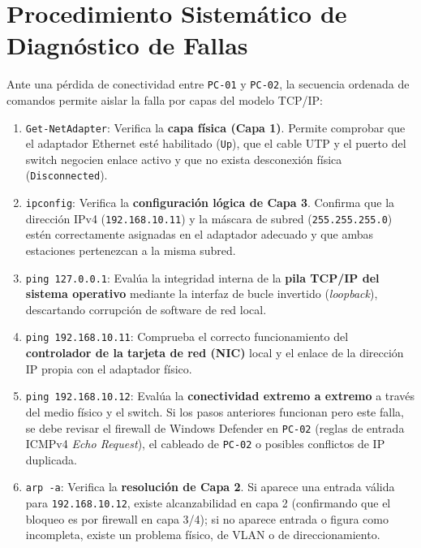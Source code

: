 \documentclass[11pt, a4paper]{article}
\begin{document}
\section{Procedimiento Sistemático de Diagnóstico de Fallas}

Ante una pérdida de conectividad entre \texttt{PC-01} y \texttt{PC-02}, la secuencia ordenada de comandos permite aislar la falla por capas del modelo TCP/IP:

\begin{enumerate}
    \item \texttt{Get-NetAdapter}: Verifica la \textbf{capa física (Capa 1)}. Permite comprobar que el adaptador Ethernet esté habilitado (\texttt{Up}), que el cable UTP y el puerto del switch negocien enlace activo y que no exista desconexión física (\texttt{Disconnected}).
    \item \texttt{ipconfig}: Verifica la \textbf{configuración lógica de Capa 3}. Confirma que la dirección IPv4 (\texttt{192.168.10.11}) y la máscara de subred (\texttt{255.255.255.0}) estén correctamente asignadas en el adaptador adecuado y que ambas estaciones pertenezcan a la misma subred.
    \item \texttt{ping 127.0.0.1}: Evalúa la integridad interna de la \textbf{pila TCP/IP del sistema operativo} mediante la interfaz de bucle invertido (\textit{loopback}), descartando corrupción de software de red local.
    \item \texttt{ping 192.168.10.11}: Comprueba el correcto funcionamiento del \textbf{controlador de la tarjeta de red (NIC)} local y el enlace de la dirección IP propia con el adaptador físico.
    \item \texttt{ping 192.168.10.12}: Evalúa la \textbf{conectividad extremo a extremo} a través del medio físico y el switch. Si los pasos anteriores funcionan pero este falla, se debe revisar el firewall de Windows Defender en \texttt{PC-02} (reglas de entrada ICMPv4 \textit{Echo Request}), el cableado de \texttt{PC-02} o posibles conflictos de IP duplicada.
    \item \texttt{arp -a}: Verifica la \textbf{resolución de Capa 2}. Si aparece una entrada válida para \texttt{192.168.10.12}, existe alcanzabilidad en capa 2 (confirmando que el bloqueo es por firewall en capa 3/4); si no aparece entrada o figura como incompleta, existe un problema físico, de VLAN o de direccionamiento.
\end{enumerate}
\end{document}
